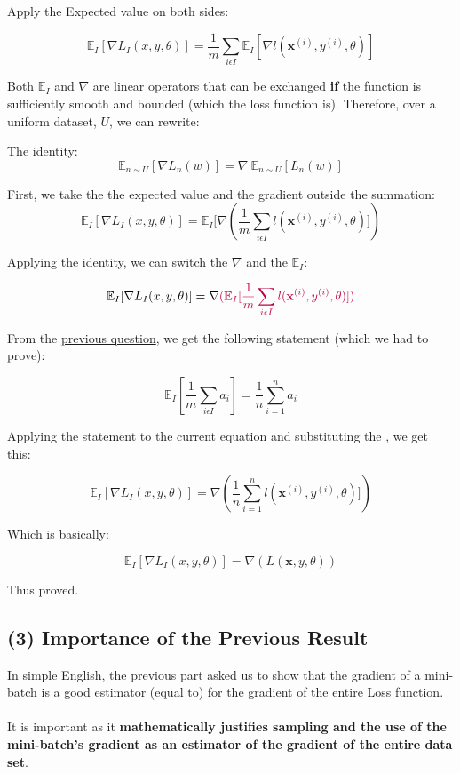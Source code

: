 \documentclass[10pt]{article}
\begin{document}
Apply the Expected value on both sides: 

\[
\mathbb{E}_{I}[
\nabla L_{I}(x,y,\theta)] = 
\frac{1}{m}
\sum_{i \epsilon I}
\mathbb{E}_{I}[\nabla l(\textbf{x}^{(i)},y^{(i)},\theta)]
\]

Both $\mathbb{E}_{I}$ and $\nabla$ are linear operators that can be exchanged \textbf{if} the function is sufficiently smooth and bounded (which the loss function is). Therefore, over a uniform dataset, $U$, we can rewrite: 

The identity: 
\[
\mathbb{E}_{n\sim U}[\nabla L_n(w)] 
= \nabla\ \mathbb{E}_{n\sim U}[ L_n(w)] 
\]

First, we take the the expected value and the gradient outside the summation: 
\[
\mathbb{E}_{I}[
\nabla L_{I}(x,y,\theta)] = 
\mathbb{E}_{I}[
\nabla(
\frac{1}{m}
\sum_{i \epsilon I}
l(\textbf{x}^{(i)},y^{(i)},\theta)])
\]

Applying the identity, we can switch the $\nabla$ and the $\mathbb{E}_{I}$:

\[
\mathbb{E}_{I}[
\nabla L_{I}(x,y,\theta)] = 
\nabla
\color{purple}{(
\mathbb{E}_{I}[
\frac{1}{m}
\sum_{i \epsilon I}
l(\textbf{x}^{(i)},y^{(i)},\theta)])}
\]

From the \hyperref[sec:mbp]{previous question}, we get the following statement (which we had to prove): 

\[
\mathbb{E}_{I}[
\frac{1}{m}
\sum_{i \epsilon I}
a_{i}]= 
\frac{1}{n}
\sum_{i =1}^{n}
a_{i} 
\]

Applying the statement to the current equation and substituting the \color{purple}{purple part}\color{black}, we get this: 

\[
\mathbb{E}_{I}[
\nabla L_{I}(x,y,\theta)] = 
\nabla
{(
\frac{1}{n}
\sum_{i =1}^{n}
l(\textbf{x}^{(i)},y^{(i)},\theta)])}
\]

Which is basically: 

\[
\mathbb{E}_{I}[
\nabla L_{I}(x,y,\theta)] = 
\nabla(
L(\textbf{x},y,\theta))
\]

Thus proved.

\subsection{(3) Importance of the Previous Result}

In simple English, the previous part asked us to show that the gradient of a mini-batch is a good estimator (equal to) for the gradient of the entire Loss function. 
\\ \\ 
It is important as it \textbf{mathematically justifies sampling and the use of the mini-batch's gradient as an estimator of the gradient of the entire data set}.
\end{document}
